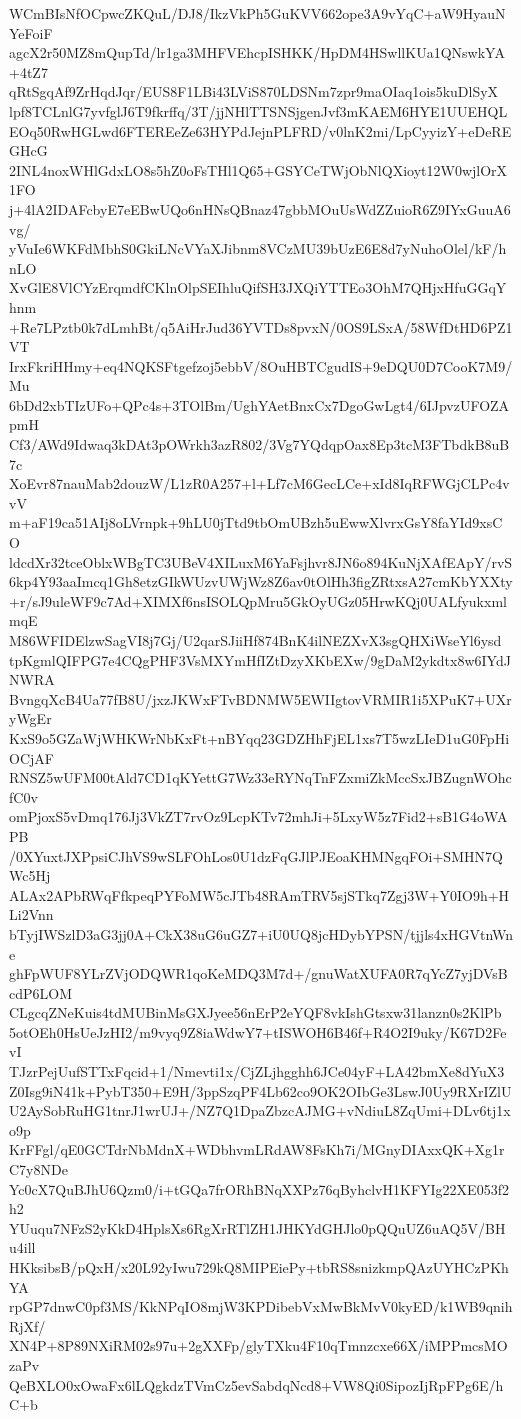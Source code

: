 WCmBIsNfOCpwcZKQuL/DJ8/IkzVkPh5GuKVV662ope3A9vYqC+aW9HyauNYeFoiF
agcX2r50MZ8mQupTd/lr1ga3MHFVEhcpISHKK/HpDM4HSwllKUa1QNswkYA+4tZ7
qRtSgqAf9ZrHqdJqr/EUS8F1LBi43LViS870LDSNm7zpr9maOIaq1ois5kuDlSyX
lpf8TCLnlG7yvfglJ6T9fkrffq/3T/jjNHlTTSNSjgenJvf3mKAEM6HYE1UUEHQL
EOq50RwHGLwd6FTEREeZe63HYPdJejnPLFRD/v0lnK2mi/LpCyyizY+eDeREGHcG
2INL4noxWHlGdxLO8s5hZ0oFsTHl1Q65+GSYCeTWjObNlQXioyt12W0wjlOrX1FO
j+4lA2IDAFcbyE7eEBwUQo6nHNsQBnaz47gbbMOuUsWdZZuioR6Z9IYxGuuA6vg/
yVuIe6WKFdMbhS0GkiLNcVYaXJibnm8VCzMU39bUzE6E8d7yNuhoOlel/kF/hnLO
XvGlE8VlCYzErqmdfCKlnOlpSEIhluQifSH3JXQiYTTEo3OhM7QHjxHfuGGqYhnm
+Re7LPztb0k7dLmhBt/q5AiHrJud36YVTDs8pvxN/0OS9LSxA/58WfDtHD6PZ1VT
IrxFkriHHmy+eq4NQKSFtgefzoj5ebbV/8OuHBTCgudIS+9eDQU0D7CooK7M9/Mu
6bDd2xbTIzUFo+QPc4s+3TOlBm/UghYAetBnxCx7DgoGwLgt4/6IJpvzUFOZApmH
Cf3/AWd9Idwaq3kDAt3pOWrkh3azR802/3Vg7YQdqpOax8Ep3tcM3FTbdkB8uB7c
XoEvr87nauMab2douzW/L1zR0A257+l+Lf7cM6GecLCe+xId8IqRFWGjCLPc4vvV
m+aF19ca51AIj8oLVrnpk+9hLU0jTtd9tbOmUBzh5uEwwXlvrxGsY8faYId9xsCO
ldcdXr32tceOblxWBgTC3UBeV4XILuxM6YaFsjhvr8JN6o894KuNjXAfEApY/rvS
6kp4Y93aaImcq1Gh8etzGIkWUzvUWjWz8Z6av0tOlHh3figZRtxsA27cmKbYXXty
+r/sJ9uleWF9c7Ad+XIMXf6nsISOLQpMru5GkOyUGz05HrwKQj0UALfyukxmlmqE
M86WFIDElzwSagVI8j7Gj/U2qarSJiiHf874BnK4ilNEZXvX3sgQHXiWseYl6ysd
tpKgmlQIFPG7e4CQgPHF3VsMXYmHfIZtDzyXKbEXw/9gDaM2ykdtx8w6IYdJNWRA
BvngqXcB4Ua77fB8U/jxzJKWxFTvBDNMW5EWIIgtovVRMIR1i5XPuK7+UXryWgEr
KxS9o5GZaWjWHKWrNbKxFt+nBYqq23GDZHhFjEL1xs7T5wzLIeD1uG0FpHiOCjAF
RNSZ5wUFM00tAld7CD1qKYettG7Wz33eRYNqTnFZxmiZkMccSxJBZugnWOhcfC0v
omPjoxS5vDmq176Jj3VkZT7rvOz9LcpKTv72mhJi+5LxyW5z7Fid2+sB1G4oWAPB
/0XYuxtJXPpsiCJhVS9wSLFOhLos0U1dzFqGJlPJEoaKHMNgqFOi+SMHN7QWc5Hj
ALAx2APbRWqFfkpeqPYFoMW5cJTb48RAmTRV5sjSTkq7Zgj3W+Y0IO9h+HLi2Vnn
bTyjIWSzlD3aG3jj0A+CkX38uG6uGZ7+iU0UQ8jcHDybYPSN/tjjls4xHGVtnWne
ghFpWUF8YLrZVjODQWR1qoKeMDQ3M7d+/gnuWatXUFA0R7qYcZ7yjDVsBcdP6LOM
CLgcqZNeKuis4tdMUBinMsGXJyee56nErP2eYQF8vkIshGtsxw31lanzn0s2KlPb
5otOEh0HsUeJzHI2/m9vyq9Z8iaWdwY7+tISWOH6B46f+R4O2I9uky/K67D2FevI
TJzrPejUufSTTxFqcid+1/Nmevti1x/CjZLjhgghh6JCe04yF+LA42bmXe8dYuX3
Z0Isg9iN41k+PybT350+E9H/3ppSzqPF4Lb62co9OK2OIbGe3LswJ0Uy9RXrIZlU
U2AySobRuHG1tnrJ1wrUJ+/NZ7Q1DpaZbzcAJMG+vNdiuL8ZqUmi+DLv6tj1xo9p
KrFFgl/qE0GCTdrNbMdnX+WDbhvmLRdAW8FsKh7i/MGnyDIAxxQK+Xg1rC7y8NDe
Yc0cX7QuBJhU6Qzm0/i+tGQa7frORhBNqXXPz76qByhclvH1KFYIg22XE053f2h2
YUuqu7NFzS2yKkD4HplsXs6RgXrRTlZH1JHKYdGHJlo0pQQuUZ6uAQ5V/BHu4ill
HKksibsB/pQxH/x20L92yIwu729kQ8MIPEiePy+tbRS8snizkmpQAzUYHCzPKhYA
rpGP7dnwC0pf3MS/KkNPqIO8mjW3KPDibebVxMwBkMvV0kyED/k1WB9qnihRjXf/
XN4P+8P89NXiRM02s97u+2gXXFp/glyTXku4F10qTmnzcxe66X/iMPPmcsMOzaPv
QeBXLO0xOwaFx6lLQgkdzTVmCz5evSabdqNcd8+VW8Qi0SipozIjRpFPg6E/hC+b
